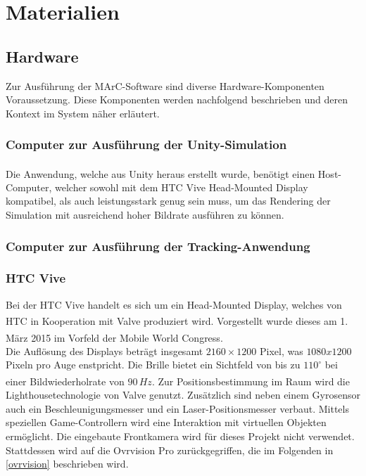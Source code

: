 \section{Materialien}
\subsection{Hardware}
Zur Ausführung der MArC-Software sind diverse Hardware-Komponenten Voraussetzung. Diese Komponenten werden nachfolgend beschrieben und deren Kontext im System näher erläutert.
\subsubsection{Computer zur Ausführung der Unity-Simulation}
Die Anwendung, welche aus Unity\textsuperscript{\cite{website:Unity}} heraus erstellt wurde, benötigt einen Host-Computer, welcher sowohl mit dem HTC Vive Head-Mounted Display kompatibel, als auch leistungsstark genug sein muss, um das Rendering der Simulation mit ausreichend hoher Bildrate ausführen zu können.

\subsubsection{Computer zur Ausführung der Tracking-Anwendung}
\subsubsection{HTC Vive} 
Bei der HTC Vive handelt es sich um ein Head-Mounted Display, welches von HTC in Kooperation mit Valve\textsuperscript{\cite{website:Valve}} produziert wird. Vorgestellt wurde dieses am 1. März 2015 im Vorfeld der Mobile World Congress\textsuperscript{\cite{website:mobileworldcongress}}.\\
Die Auflösung des Displays beträgt insgesamt $2160\times1200$ Pixel, was $1080x1200$ Pixeln pro Auge enstpricht. Die Brille bietet ein Sichtfeld von bis zu $110^\circ$ bei einer Bildwiederholrate von $90\,Hz$\textsuperscript{\cite{website:HTC_Vive}}. Zur Positionsbestimmung im Raum wird die Lighthousetechnologie von Valve genutzt. Zusätzlich sind neben einem Gyrosensor auch ein Beschleunigungsmesser und ein Laser-Positionsmesser verbaut. Mittels speziellen Game-Controllern wird eine Interaktion mit virtuellen Objekten ermöglicht. Die eingebaute Frontkamera wird für dieses Projekt nicht verwendet. Stattdessen wird auf die Ovrvision Pro zurückgegriffen, die im Folgenden in \ref{ovrvision} beschrieben wird.


